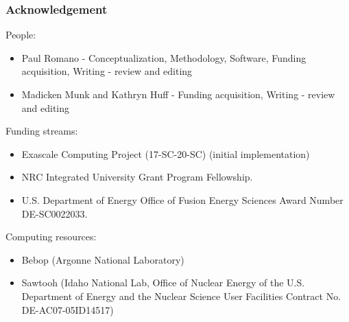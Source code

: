 \begin{frame}
  \frametitle{Acknowledgement}
  People:
  \begin{itemize}
      \item Paul Romano - Conceptualization, Methodology, Software, Funding acquisition, Writing - review and editing
      \item Madicken Munk and Kathryn Huff - Funding acquisition, Writing - review and editing 
  \end{itemize}

  Funding streams:
  \begin{itemize}
      \item Exascale Computing Project (17-SC-20-SC) (initial implementation)
      \item NRC Integrated University Grant Program Fellowship.
      \item U.S. Department of Energy Office of Fusion Energy Sciences Award Number DE-SC0022033.
  \end{itemize}

  Computing resources:
  \begin{itemize}
      \item Bebop (Argonne National Laboratory)
      \item Sawtooh (Idaho National Lab, Office of Nuclear Energy of the U.S.
          Department of Energy and the Nuclear Science User Facilities Contract
          No. DE-AC07-05ID14517)
  \end{itemize}
\end{frame}
